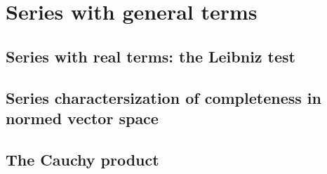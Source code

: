 \section{Series with general terms}

\subsection{Series with real terms: the Leibniz test}

\subsection{Series charactersization of completeness in normed vector space}

\subsection{The Cauchy product}

